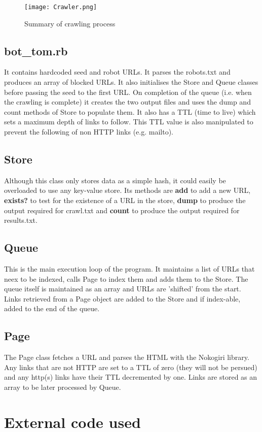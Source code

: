 \documentclass[a4paper,11pt]{article}
\begin{document}
\begin{figure}[h]
  \centering
  \texttt{[image: Crawler.png]}
  \caption{Summary of crawling process}
\end{figure}

\subsection{bot\_tom.rb}
It contains hardcoded seed and robot URLs.  It parses the robots.txt and produces an array of blocked URLs.  It also initialises the Store and Queue classes before passing the seed to the first URL.  On completion of the queue (i.e. when the crawling is complete) it creates the two output files and uses the dump and count methods of Store to populate them.  It also has a TTL (time to live) which sets a maximum depth of links to follow.  This TTL value is also manipulated to prevent the following of non HTTP links (e.g. mailto).

\subsection{Store}
Although this class only stores data as a simple hash, it could easily be overloaded to use any key-value store.  Its methods are \textbf{add} to add a new URL,  \textbf{exists?} to test for the existence of a URL in the store, \textbf{dump} to produce the output required for crawl.txt and \textbf{count} to produce the output required for results.txt.

\subsection{Queue}
This is the main execution loop of the program.  It maintains a list of URLs that neex to be indexed, calls Page to index them and adds them to the Store.  The queue itself is maintained as an array and URLs are 'shifted' from the start.  Links retrieved from a Page object are added to the Store and if index-able, added to the end of the queue.

\subsection{Page}
The Page class fetches a URL and parses the HTML with the Nokogiri library.  Any links that are not HTTP are set to a TTL of zero (they will not be persued) and any http(s) links have their TTL decremented by one.  Links are stored as an array to be later processed by Queue.

\section{External code used}
\end{document}
